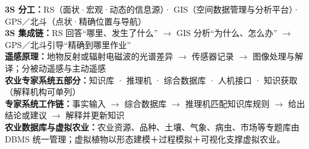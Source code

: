 \documentclass[a4paper,11pt]{article}
\begin{document}

\begin{knowmap}
\textbf{3S 分工：}RS（面状·宏观·动态的信息源）· GIS（空间数据管理与分析平台）· GPS／北斗（点状·精确位置与导航）\\[2pt]
\textbf{3S 集成链：}RS 回答“哪里、发生了什么” $\rightarrow$ GIS 分析“为什么、怎么办” $\rightarrow$ GPS／北斗引导“精确到哪里作业”\\[2pt]
\textbf{遥感原理：}地物反射或辐射电磁波的光谱差异 $\rightarrow$ 传感器记录 $\rightarrow$ 图像处理与解译；分被动遥感与主动遥感\\[2pt]
\textbf{农业专家系统五部分：}知识库 · 推理机 · 综合数据库 · 人机接口 · 知识获取（解释机构可单列）\\[2pt]
\textbf{专家系统工作链：}事实输入 $\rightarrow$ 综合数据库 $\rightarrow$ 推理机匹配知识库规则 $\rightarrow$ 给出结论或建议 $\rightarrow$ 解释并更新知识\\[2pt]
\textbf{农业数据库与虚拟农业：}农业资源、品种、土壤、气象、病虫、市场等专题库由 DBMS 统一管理；虚拟植物以形态建模＋过程模拟＋可视化支撑虚拟农业。
\end{knowmap}
\end{document}
